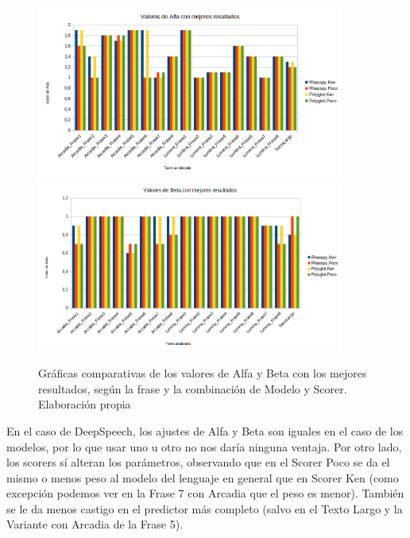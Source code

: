 \begin{figure}[H]
	\includegraphics[width=0.9\textwidth]{imagenes/Alfas.png} \hfill \includegraphics[width=0.9\textwidth]{imagenes/Betas.png}
	\caption{Gráficas comparativas de los valores de Alfa y Beta con los mejores resultados, según la frase y la combinación de Modelo y Scorer. Elaboración propia}
\end{figure}

En el caso de DeepSpeech, los ajustes de Alfa y Beta son iguales en el caso de los modelos, por lo que usar uno u otro no nos daría ninguna ventaja. Por otro lado, los scorers sí alteran los parámetros, observando que en el Scorer Poco se da el mismo o menos peso al modelo del lenguaje en general que en Scorer Ken (como excepción podemos ver en la Frase 7 con Arcadia que el peso es menor). También se le da menos castigo en el predictor más completo (salvo en el Texto Largo y la Variante con Arcadia de la Frase 5).

